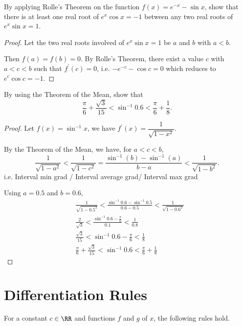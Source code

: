 \begin{exercise}
By applying Rolle's Theorem on the function $f(x)=e^{-x}-\sin x$, show that there is at least one real root of $e^x\cos x=-1$ between any two real roots of $e^x\sin x=1$.
\end{exercise}

\begin{proof}
Let the two real roots involved of $e^x\sin x=1$ be $a$ and $b$ with $a<b$.

Then $f(a)=f(b)=0$. By Rolle's Theorem, there exist a value $c$ with $a<c<b$ such that $f^\prime(c)=0$, i.e. $-e^{-c}-\cos c=0$ which reduces to $e^c\cos c=-1$.
\end{proof}

\begin{exercise}
By using the Theorem of the Mean, show that
\[ \frac{\pi}{6}+\frac{\sqrt{3}}{15}<\sin^{-1}0.6<\frac{\pi}{6}+\frac{1}{8}. \]
\end{exercise}

\begin{proof}
Let $f(x)=\sin^{-1}x$, we have $f^\prime(x)=\dfrac{1}{\sqrt{1-x^2}}$.

By the Theorem of the Mean, we have, for $a<c<b$,
\[ \frac{1}{\sqrt{1-a^2}}<\frac{1}{\sqrt{1-c^2}}=\frac{\sin^{-1}(b)-\sin^{-1}(a)}{b-a}<\frac{1}{\sqrt{1-b^2}}. \]
i.e. Interval min grad / Interval average grad/ Interval max grad

Using $a=0.5$ and $b=0.6$,
\begin{align*}
&\frac{1}{\sqrt{1-0.5^2}}<\frac{\sin^{-1}0.6-\sin^{-1}0.5}{0.6-0.5}<\frac{1}{\sqrt{1-0.6^2}} \\
&\frac{2}{\sqrt{3}}<\frac{\sin^{-1}0.6-\frac{\pi}{6}}{0.1}<\frac{1}{0.8} \\
&\frac{\sqrt{3}}{15}<\sin^{-1}0.6-\frac{\pi}{6}<\frac{1}{8} \\
&\frac{\pi}{6}+\frac{\sqrt{3}}{15}<\sin^{-1}0.6<\frac{\pi}{6}+\frac{1}{8}
\end{align*}
\end{proof}
\pagebreak

\section{Differentiation Rules}
For a constant $c\in\RR$ and functions $f$ and $g$ of $x$, the following rules hold.

